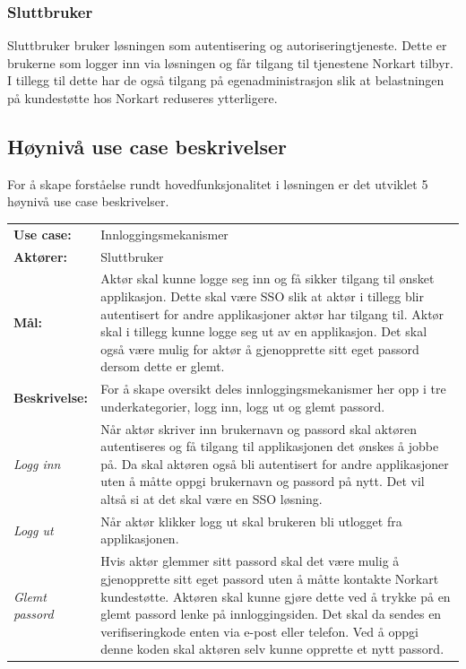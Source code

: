 \subsubsection*{Sluttbruker}
Sluttbruker bruker løsningen som autentisering og autoriseringtjeneste. Dette er brukerne som logger inn via løsningen og får tilgang til tjenestene Norkart tilbyr. I tillegg til dette har de også tilgang på egenadministrasjon slik at belastningen på kundestøtte hos Norkart reduseres ytterligere.

\subsection{Høynivå use case beskrivelser}
\label{subsec:kravspesifikasjon_funksjonelleKrav_hoyNivaa}
For å skape forståelse rundt hovedfunksjonalitet i løsningen er det utviklet 5 høynivå use case beskrivelser.

\begin{framed}
    \begin{tabular}{l p{9cm}}
        \textbf{Use case:} & Innloggingsmekanismer \\
        \textbf{Aktører:} & Sluttbruker
        \bigskip \\
        \textbf{Mål:} & Aktør skal kunne logge seg inn og få sikker tilgang til ønsket applikasjon. Dette skal være SSO slik at aktør i tillegg blir autentisert for andre applikasjoner aktør har tilgang til. Aktør skal i tillegg kunne logge seg ut av en applikasjon. Det skal også være mulig for aktør å gjenopprette sitt eget passord dersom dette er glemt.
        \bigskip \\
        \textbf{Beskrivelse:} & For å skape oversikt deles innloggingsmekanismer her opp i tre underkategorier, logg inn, logg ut og glemt passord. 
        \bigskip \\ 
        \textit{Logg inn} & Når aktør skriver inn brukernavn og passord skal aktøren autentiseres og få tilgang til applikasjonen det ønskes å jobbe på. Da skal aktøren også bli autentisert for andre applikasjoner uten å måtte oppgi brukernavn og passord på nytt. Det vil altså si at det skal være en SSO løsning. 
        \bigskip \\
        \textit{Logg ut} & Når aktør klikker logg ut skal brukeren bli utlogget fra applikasjonen.
        \bigskip \\
        \textit{Glemt passord} & Hvis aktør glemmer sitt passord skal det være mulig å gjenopprette sitt eget passord uten å måtte kontakte Norkart kundestøtte. Aktøren skal kunne gjøre dette ved å trykke på en glemt passord lenke på innloggingsiden. Det skal da sendes en verifiseringkode enten via e-post eller telefon. Ved å oppgi denne koden skal aktøren selv kunne opprette et nytt passord.
    \end{tabular}
\end{framed}

